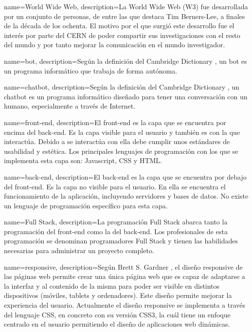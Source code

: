 
\makeglossaries


{
    name=World Wide Web,
    description={La World Wide Web (W3) fue desarrollada por un conjunto de personas, de entre las que destaca Tim Berners-Lee, a finales de la década de los ochenta. El motivo por el que surgió este desarrollo fue el interés por parte del CERN de poder compartir sus investigaciones con el resto del mundo y por tanto mejorar la comunicación en el mundo investigador.}
}

{
    name=bot,
    description={Según la definición del Cambridge Dictionary \cite{RefWorks:RefID:30-bot}, un bot es un programa informático que trabaja de forma autónoma.}
}

{
    name=chatbot,
    description={Según la definición del Cambridge Dictionary \cite{RefWorks:RefID:31-chatbot}, un chatbot es un programa informático diseñado para tener una conversación con un humano, especialmente a través de Internet.}
}

{
    name=front-end,
    description={El front-end es la capa que se encuentra por encima del \gls{back-end}. Es la capa visible para el usuario y también es con la que interactúa. Debido a se interactúa con ella debe cumplir unos estándares de usabilidad y estética. Los principales lenguajes de programación con los que se implementa esta capa son: Javascript, CSS y HTML.}
}

{
    name=back-end,
    description={El back-end es la capa que se encuentra por debajo del \gls{front-end}. Es la capa no visible para el usuario. En ella se encuentra el funcionamiento de la aplicación, incluyendo servidores y bases de datos. No existe un lenguaje de programación específico para esta capa.}
}

{
    name=Full Stack,
    description={La programación Full Stack abarca tanto la programación del \gls{front-end} como la del \gls{back-end}. Los profesionales de esta programación se denominan programadores Full Stack y tienen las habilidades necesarias para administrar un proyecto completo.}
}

{
    name=responsive,
    description={Según Brett S. Gardner \cite{RefWorks:RefID:34-2011responsive}, el diseño responsive de las páginas web permite crear una única página web que es capaz de adaptarse a la interfaz y al contenido de la misma para poder ser visible en distintos dispositivos (móviles, tablets y ordenadores). Este diseño permite mejorar la experiencia del usuario. Actualmente el diseño responsive se implementa a través del lenguaje CSS, en concreto con su versión CSS3, la cuál tiene un enfoque centrado en el usuario permitiendo el diseño de aplicaciones web dinámicas.}
}

